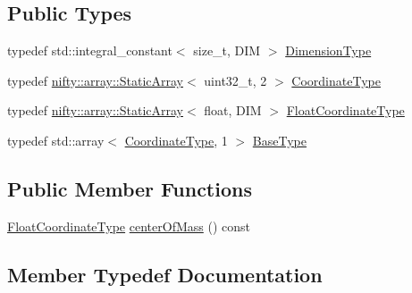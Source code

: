 \subsection*{Public Types}
\begin{DoxyCompactItemize}
\item 
typedef std\+::integral\+\_\+constant$<$ size\+\_\+t, D\+IM $>$ \hyperlink{classnifty_1_1cgp_1_1CellGeometry_3_01DIM_00_010_01_4_a71116d45ef5d2db3ccf29b0258df02ed}{Dimension\+Type}
\item 
typedef \hyperlink{namespacenifty_1_1array_a683f151f19c851754e0c6d55ed16a0c2}{nifty\+::array\+::\+Static\+Array}$<$ uint32\+\_\+t, 2 $>$ \hyperlink{classnifty_1_1cgp_1_1CellGeometry_3_01DIM_00_010_01_4_a3c8cec60edc558f44940e98135a521f0}{Coordinate\+Type}
\item 
typedef \hyperlink{namespacenifty_1_1array_a683f151f19c851754e0c6d55ed16a0c2}{nifty\+::array\+::\+Static\+Array}$<$ float, D\+IM $>$ \hyperlink{classnifty_1_1cgp_1_1CellGeometry_3_01DIM_00_010_01_4_a825cfc0d2e082ccd4b34e5ab2046dbe6}{Float\+Coordinate\+Type}
\item 
typedef std\+::array$<$ \hyperlink{classnifty_1_1cgp_1_1CellGeometry_3_01DIM_00_010_01_4_a3c8cec60edc558f44940e98135a521f0}{Coordinate\+Type}, 1 $>$ \hyperlink{classnifty_1_1cgp_1_1CellGeometry_3_01DIM_00_010_01_4_a299d8c228b7529d2e95f90aa3b2f7528}{Base\+Type}
\end{DoxyCompactItemize}
\subsection*{Public Member Functions}
\begin{DoxyCompactItemize}
\item 
\hyperlink{classnifty_1_1cgp_1_1CellGeometry_3_01DIM_00_010_01_4_a825cfc0d2e082ccd4b34e5ab2046dbe6}{Float\+Coordinate\+Type} \hyperlink{classnifty_1_1cgp_1_1CellGeometry_3_01DIM_00_010_01_4_a5e690a9e80174e40c03b74a2804dd0a8}{center\+Of\+Mass} () const
\end{DoxyCompactItemize}


\subsection{Member Typedef Documentation}
\mbox{\label{classnifty_1_1cgp_1_1CellGeometry_3_01DIM_00_010_01_4_a299d8c228b7529d2e95f90aa3b2f7528}} 
